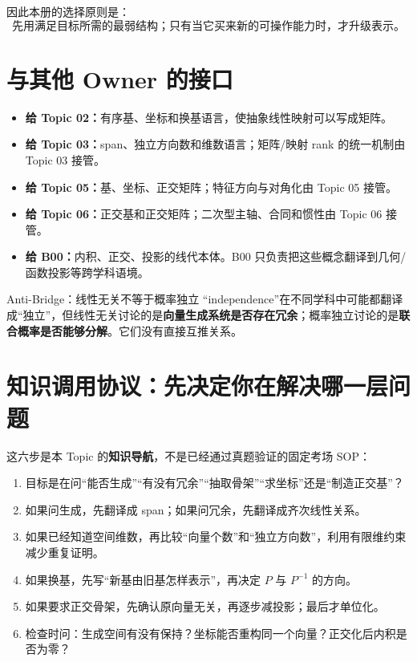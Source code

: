 \documentclass[11pt,a4paper]{ctexart}
\newcommand{\kw}[1]{\textbf{\color{deep}#1}}
\begin{document}
因此本册的选择原则是：
\[
\boxed{\text{先用满足目标所需的最弱结构；只有当它买来新的可操作能力时，才升级表示。}}
\]

\section{与其他 Owner 的接口}

\begin{itemize}
  \item \kw{给 Topic 02：}有序基、坐标和换基语言，使抽象线性映射可以写成矩阵。
  \item \kw{给 Topic 03：}span、独立方向数和维数语言；矩阵/映射 rank 的统一机制由 Topic 03 接管。
  \item \kw{给 Topic 05：}基、坐标、正交矩阵；特征方向与对角化由 Topic 05 接管。
  \item \kw{给 Topic 06：}正交基和正交矩阵；二次型主轴、合同和惯性由 Topic 06 接管。
  \item \kw{给 B00：}内积、正交、投影的线代本体。B00 只负责把这些概念翻译到几何/函数投影等跨学科语境。
\end{itemize}

\begin{warnbox}{Anti-Bridge：线性无关不等于概率独立}
“independence”在不同学科中可能都翻译成“独立”，但线性无关讨论的是\kw{向量生成系统是否存在冗余}；概率独立讨论的是\kw{联合概率是否能够分解}。它们没有直接互推关系。
\end{warnbox}

\section{知识调用协议：先决定你在解决哪一层问题}

这六步是本 Topic 的\kw{知识导航}，不是已经通过真题验证的固定考场 SOP：

\begin{enumerate}
  \item 目标是在问“能否生成”“有没有冗余”“抽取骨架”“求坐标”还是“制造正交基”？
  \item 如果问生成，先翻译成 span；如果问冗余，先翻译成齐次线性关系。
  \item 如果已经知道空间维数，再比较“向量个数”和“独立方向数”，利用有限维约束减少重复证明。
  \item 如果换基，先写“新基由旧基怎样表示”，再决定 $P$ 与 $P^{-1}$ 的方向。
  \item 如果要求正交骨架，先确认原向量无关，再逐步减投影；最后才单位化。
  \item 检查时问：生成空间有没有保持？坐标能否重构同一个向量？正交化后内积是否为零？
\end{enumerate}
\end{document}
